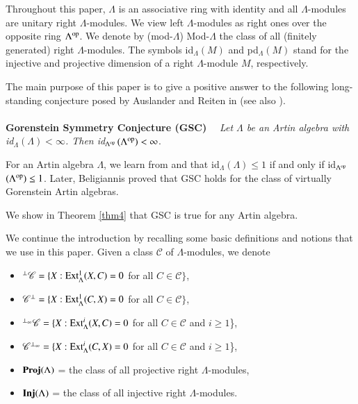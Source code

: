 \documentclass[11pt,a4paper]{article}
\begin{document}
Throughout this paper, $\Lambda$ is an associative ring with identity and
all $\Lambda$-modules are unitary  right  $\Lambda$-modules. We view left $\Lambda$-modules as right  ones over
the opposite ring $\Lambda^{{\rm op}}$. We denote by (mod-$\Lambda$)  Mod-$\Lambda$ the class of all  (finitely generated) right    $\Lambda$-modules.
The symbols  id$_{\Lambda}$$(M)$ and pd$_{\Lambda}$$(M)$  stand  for the   injective and projective   dimension of
  a  right $\Lambda$-module $M$, respectively.

  The main purpose of this paper is to give a positive
answer to the following  long-standing conjecture posed by  Auslander and Reiten in \cite[p. 150]{ar1} (see also \cite[Conjecture (13)]{ars}).
\\
\\
{\bf Gorenstein Symmetry Conjecture (GSC) }\ \ {\it  Let   $\Lambda$  be    an Artin algebra   with {\rm id}$_{\Lambda}$$(\Lambda) < \infty$. Then {\rm id}$_{\Lambda^{{\rm op}}}$$(\Lambda^{{\rm op}}) < \infty$}.
\\
\par
For an Artin algebra $\Lambda$,   we learn from \cite[p. 121]{ar1}  and  \cite[Corollary 2]{hua} that {\rm id}$_{\Lambda}$$(\Lambda) \leq 1$ if and only if {\rm id}$_{\Lambda^{{\rm op}}}$$(\Lambda^{{\rm op}}) \leq 1$.
Later, Beligiannis \cite[Theorem 11.4]{bel}  proved that GSC holds for the class of  virtually Gorenstein Artin  algebras.

We show in Theorem \ref{thm4}   that GSC is true for any Artin  algebra.
\\
\par
We continue the introduction by recalling some basic definitions and notions
that we use in this paper. Given a class $ \mathscr{C}$ of    $\Lambda$-modules, we denote

  \begin{itemize}
 \item  $^\perp {\mathscr{C}}=\{X: {\rm Ext_{\Lambda}^{1}}(X, C)=0$  for all $C\in
{\mathscr {C}}\}$,
 \item  $ {\mathscr {C}}^\perp=\{X: {\rm Ext_{\Lambda}^{1}}(C, X)=0$
for all $C\in {\mathscr {C}}\}$,
\item  $^{\perp_{\infty}} {\mathscr{C}}=\{X: {\rm Ext}_{\Lambda}^{i}(X, C)=0$  for all $C\in
{\mathscr {C}} $  and $i \geq 1$\},
 \item  $ {\mathscr {C}}^{\perp_{\infty}}=\{X: {\rm Ext}_{\Lambda}^{i}(C, X)=0 $
for all $C\in {\mathscr {C}}$  and $i \geq 1$\},
\item${\bf Proj}(\Lambda)$
= the class of all projective right $\Lambda$-modules,
\item${\bf Inj}(\Lambda)$
= the class of all injective right $\Lambda$-modules.\end{itemize}
\end{document}
